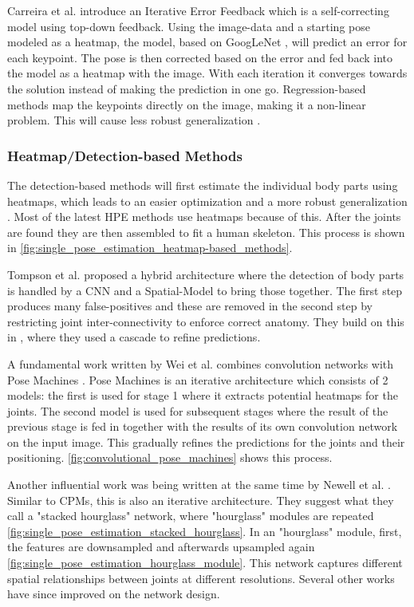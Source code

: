 Carreira et al. \cite{CarreiraAFM15} introduce an Iterative Error Feedback which is a self-correcting model using top-down feedback.
Using the image-data and a starting pose modeled as a heatmap, the model, based on GoogLeNet \cite{googlenet}, will predict an error for each keypoint.
The pose is then corrected based on the error and fed back into the model as a heatmap with the image.
With each iteration it converges towards the solution instead of making the prediction in one go.
Regression-based methods map the keypoints directly on the image, making it a non-linear problem.
This will cause less robust generalization \cite{Liu2104}.

\subsubsection{Heatmap/Detection-based Methods}
The detection-based methods will first estimate the individual body parts using heatmaps, which leads to an easier optimization and a more robust generalization \cite{chen2022}.
Most of the latest \gls{HPE} methods use heatmaps because of this.
After the joints are found they are then assembled to fit a human skeleton.
This process is shown in \ref{fig:single_pose_estimation_heatmap-based_methods}.

Tompson et al. \cite{TompsonJLB14} proposed a hybrid architecture where the detection of body parts is handled by a \gls{CNN} and a Spatial-Model to bring those together.
The first step produces many false-positives and these are removed in the second step by restricting joint inter-connectivity to enforce correct anatomy.
They build on this in \cite{Tompson2015}, where they used a cascade to refine predictions.

A fundamental work written by Wei et al. \cite{Wei2016} combines convolution networks with Pose Machines \cite{Ramakrishna2014}.
Pose Machines is an iterative architecture which consists of 2 models: the first is used for stage 1 where it extracts potential heatmaps for the joints.
The second model is used for subsequent stages where the result of the previous stage is fed in together with the results of its own convolution network on the input image. 
This gradually refines the predictions for the joints and their positioning.
\ref{fig:convolutional_pose_machines} shows this process.

Another influential work was being written at the same time by Newell et al. \cite{Newell2016}.
Similar to \gls{CPMs}, this is also an iterative architecture.
They suggest what they call a "stacked hourglass" network, where "hourglass" modules are repeated \ref{fig:single_pose_estimation_stacked_hourglass}.
In an "hourglass" module, first, the features are downsampled and afterwards upsampled again \ref{fig:single_pose_estimation_hourglass_module}.
This network captures different spatial relationships between joints at different resolutions.
Several other works \cite{Yang2017}\cite{Yu2017}\cite{Chou17} have since improved on the network design.

